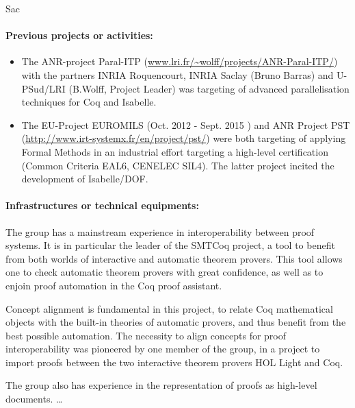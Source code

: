 \begin{sitedescription}{Sac}
\paragraph{Previous projects or activities:}


\begin{itemize}
\item The ANR-project Paral-ITP (\url{www.lri.fr/~wolff/projects/ANR-Paral-ITP/}) with the  
      partners INRIA Roquencourt, INRIA Saclay (Bruno Barras) 
      and U-PSud/LRI (B.Wolff, Project Leader) was targeting 
      of advanced parallelisation techniques for Coq and Isabelle.
\item The EU-Project EUROMILS (Oct. 2012 - Sept. 2015 ) and 
      ANR Project PST (\url{http://www.irt-systemx.fr/en/project/pst/})
      were both targeting of applying Formal Methods in an industrial
      effort targeting a high-level certification (Common Criteria EAL6, 
      CENELEC SIL4). The latter project incited the development of Isabelle/DOF\cite{brucker_achim_d_2019_3370483}.
\end{itemize} 

\paragraph{Infrastructures or technical equipments:}


The group has a mainstream experience in interoperability between proof
systems. It is in particular the leader of the SMTCoq project, a tool to
benefit from both worlds of interactive and automatic theorem provers.
This tool allows one to check automatic theorem provers with great
confidence, as well as to enjoin proof automation in the Coq proof
assistant.

Concept alignment is fundamental in this project, to relate Coq
mathematical objects with the built-in theories of automatic provers,
and thus benefit from the best possible automation. The necessity to
align concepts for proof interoperability was pioneered by one member of
the group, in a project to import proofs between the two interactive
theorem provers HOL Light and Coq.

The group also has experience in the representation of proofs as
high-level documents. \dots


\end{sitedescription}

